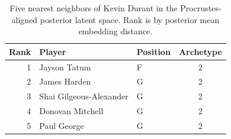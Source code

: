 \begin{table}[htbp]
  \centering\small
  \begin{tabular}{rllc}
    \toprule
    Rank & Player & Position & Archetype \\
    \midrule
    1 & Jayson Tatum & F & 2 \\
    2 & James Harden & G & 2 \\
    3 & Shai Gilgeous-Alexander & G & 2 \\
    4 & Donovan Mitchell & G & 2 \\
    5 & Paul George & G & 2 \\
    \bottomrule
  \end{tabular}
  \caption{Five nearest neighbors of Kevin Durant in the Procrustes-aligned posterior latent space. Rank is by posterior mean embedding distance.}
\end{table}

